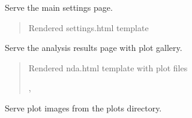 \documentclass[a4paper,11pt,english,openany,oneside]{sphinxmanual}
\begin{document}
\begin{fulllineitems}
\label{\detokenize{modules/api:app.routes.index}}
\pysigstartsignatures
\pysiglinewithargsret
{}
{}
{}
\pysigstopsignatures
\sphinxAtStartPar
Serve the main settings page.
\begin{quote}\begin{description}
\sphinxAtStartPar
Rendered settings.html template

\sphinxAtStartPar
{}

\end{description}\end{quote}

\end{fulllineitems}


\begin{fulllineitems}
\label{\detokenize{modules/api:app.routes.nda}}
\pysigstartsignatures
\pysiglinewithargsret
{}
{}
{}
\pysigstopsignatures
\sphinxAtStartPar
Serve the analysis results page with plot gallery.
\begin{quote}\begin{description}
\sphinxAtStartPar
Rendered nda.html template with plot files

\sphinxAtStartPar
\sphinxhref{https://docs.python.org/3/library/typing.html\#typing.Tuple}{\sphinxstyleemphasis{Tuple}}{[}, \sphinxhref{https://docs.python.org/3/library/functions.html\#int}{int}{]}

\end{description}\end{quote}

\end{fulllineitems}


\begin{fulllineitems}
\label{\detokenize{modules/api:app.routes.serve_plot}}
\pysigstartsignatures
\pysiglinewithargsret
{}
{}
{}
\pysigstopsignatures
\sphinxAtStartPar
Serve plot images from the plots directory.

\end{fulllineitems}
\end{document}
